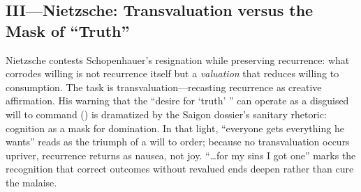 \subsection*{III—Nietzsche: Transvaluation versus the Mask of “Truth”}
\label{ssec:iii-nietzsche}
Nietzsche contests Schopenhauer’s resignation while preserving recurrence: what corrodes willing is not recurrence itself but a \emph{valuation} that reduces willing to consumption. The task is transvaluation—recasting recurrence as creative affirmation. His warning that the “desire for ‘truth’ ” can operate as a disguised will to command (\parencite[\S34]{NietzscheBGE1990}) is dramatized by the Saigon dossier’s sanitary rhetoric: cognition as a mask for domination. In that light, “everyone gets everything he wants” reads as the triumph of a will to order; because no transvaluation occurs upriver, recurrence returns as nausea, not joy. “…for my sins I got one” marks the recognition that correct outcomes without revalued ends deepen rather than cure the malaise.
